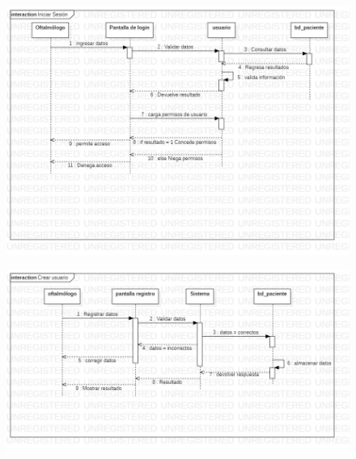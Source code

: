 \documentclass[10pt]{article}
\begin{document}
\begin{figure}[H]
	\begin{center}
\includegraphics[scale = 0.45]{UML/Secuencias/Caso_de_uso_1.jpg} 
	\end{center} 
\end{figure}

\begin{figure}[H]
	\begin{center}
\includegraphics[scale = 0.45]{UML/Secuencias/Caso_de_uso_2.jpg} 
	\end{center} 
\end{figure}
\end{document}
